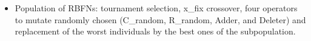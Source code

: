 \documentclass[a4paper,twoside]{article}
\begin{document}
\begin{itemize}
  \item{Population of RBFNs:} tournament selection, x\_fix crossover, four operators to mutate randomly chosen (C\_random, R\_random, Adder, and Deleter) and replacement of the worst individuals by the best ones of the subpopulation.

\end{itemize}
\end{document}
